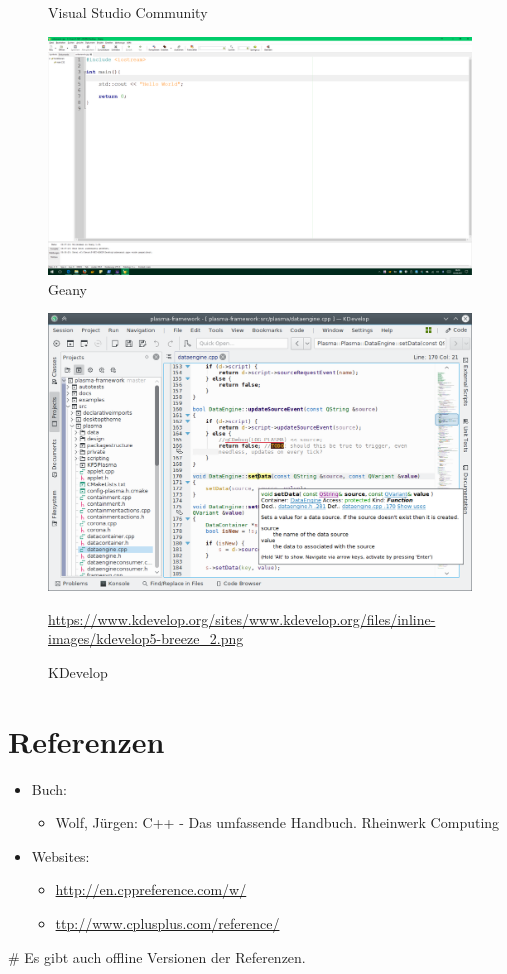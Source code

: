 \documentclass[a4paper]{report}
\begin{document}
\begin{center}
\begin{figure}
	\caption{Visual Studio Community}
	\label{pic:visualstudio}	
\end{figure}
\begin{figure}
	\includegraphics[width = \textwidth]{01/geany.png}
	\caption{Geany}
	\label{pic:geany}	
\end{figure}
\begin{figure}
	\includegraphics[width = \textwidth]{01/kdevelop.png}
	\caption{KDevelop}
	\url{https://www.kdevelop.org/sites/www.kdevelop.org/files/inline-images/kdevelop5-breeze_2.png}
	\label{pic:kdevelop}	
	\label{end:ide:picts}
\end{figure}
\end{center}

\section{Referenzen}

\begin{itemize}
	\item Buch:
	\begin{itemize}
		\item Wolf, Jürgen: C++ - Das umfassende Handbuch. Rheinwerk Computing
	\end{itemize}
	\item Websites:
	\begin{itemize}
		\item \url{http://en.cppreference.com/w/}
		\item \url{ttp://www.cplusplus.com/reference/}
	\end{itemize}
\end{itemize}
\# Es gibt auch offline Versionen der Referenzen.
\end{document}
